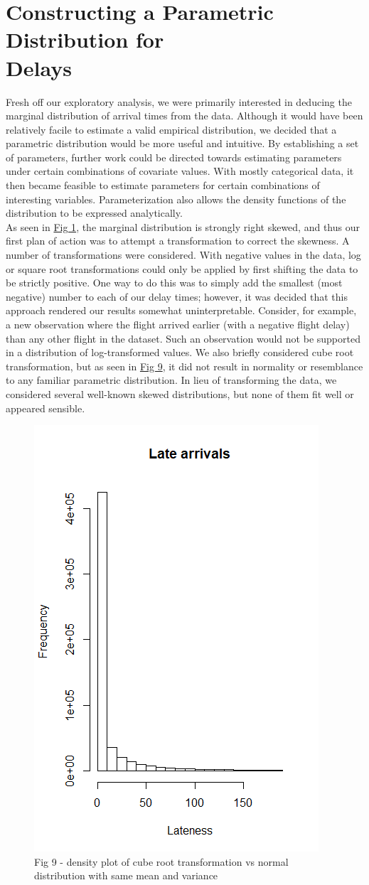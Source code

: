 \documentclass[12pt, a4paper, openany]{book}
\newcommand\tab[1][1cm]{\hspace*{#1}}
\begin{document}
	\section{Constructing a Parametric Distribution for \\Delays}
	 \tab Fresh off our exploratory analysis, we were primarily interested in deducing the marginal distribution of arrival times from the data. Although it would have been relatively facile to estimate a valid empirical distribution, we decided that a parametric distribution would be more useful and intuitive. By establishing a set of parameters, further work could be directed towards estimating parameters under certain combinations of covariate values. With mostly categorical data, it then became feasible to estimate parameters for certain combinations of interesting variables. Parameterization also allows the density functions of the distribution to be expressed analytically.\\
	\tab As seen in \underline{Fig 1}, the marginal distribution is strongly right skewed, and thus our first plan of action was to attempt a transformation to correct the skewness. A number of transformations were considered. With negative values in the data, log or square root transformations could only be applied by first shifting the data to be strictly positive. One way to do this was to simply add the smallest (most negative) number to each of our delay times; however, it was decided that this approach rendered our results somewhat uninterpretable. Consider, for example, a new observation where the flight arrived earlier (with a negative flight delay) than any other flight in the dataset. Such an observation would not be supported in a distribution of log-transformed values. We also briefly considered cube root transformation, but as seen in \underline{Fig 9}, it did not result in normality or resemblance to any familiar parametric distribution. In lieu of transforming the data, we considered several well-known skewed distributions, but none of them fit well or appeared sensible.\\
			\begin{figure}
			\centering
	 		\includegraphics[width = .35 \textwidth]{../figures/LateArrivalsHistogram}
	 		\caption{Fig 9 - density plot of cube root transformation vs normal distribution with same mean and variance}
	 		\end{figure}
\end{document}
